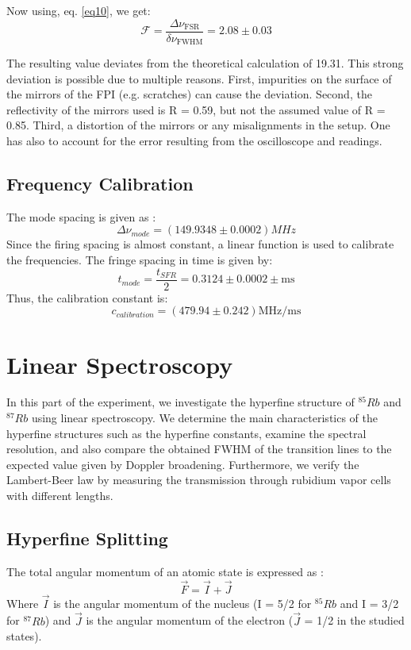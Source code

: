 \documentclass[12pt]{article}
\begin{document}
Now using, eq. \ref{eq10}, we get: 
\begin{equation*}
    \mathcal{F} = \frac{\Delta \nu_{\mathrm{FSR}}}{\delta \nu_{\mathrm{FWHM}}} = 2.08 \pm 0.03 
    \label{eq100}
\end{equation*}

The resulting value deviates from the theoretical calculation of 19.31. This strong deviation is possible due to multiple reasons. First, impurities on the surface of the mirrors of the FPI (e.g. scratches) can cause the deviation. Second, the reflectivity of the mirrors used is R = 0.59, but not the assumed value of R = 0.85. Third, a distortion of the mirrors or any misalignments in the setup. One has also to account for the error resulting from the oscilloscope and readings. 

\subsection{Frequency Calibration}
The mode spacing is given as \cite{lecturenote}:
\begin{equation}
    \Delta \nu_{mode} = (149.9348 \pm 0.0002) MHz 
    \label{eq11}
\end{equation}
Since the firing spacing is almost constant, a linear function is used to calibrate the frequencies. The fringe spacing in time is given by:
\begin{equation}
    t_{mode} = \frac{t_{SFR}}{2} = 0.3124 \pm 0.0002\pm \mathrm{ms}
    \label{eq12}
\end{equation}
Thus, the calibration constant is:
\begin{equation*}
    c_{calibration} = (479.94 \pm 0.242) \mathrm{MHz /ms}
\end{equation*}

\section{Linear Spectroscopy}
In this part of the experiment, we investigate the hyperfine structure of $^{85}Rb$ and $^{87}Rb$ using linear spectroscopy. We determine the main characteristics of the hyperfine structures such as the hyperfine constants, examine the spectral resolution, and also compare the obtained FWHM of the transition lines to the expected value given by Doppler broadening. Furthermore, we verify the Lambert-Beer law by measuring the transmission through rubidium vapor cells with different lengths. 

\subsection{Hyperfine Splitting}
The total angular momentum of an atomic state is expressed as \cite{lecturenote}:
\begin{equation*}
    \vec{F}=\vec{I}+\vec{J}
\end{equation*}
Where $\vec{I}$ is the angular momentum of the nucleus (I = 5/2 for $^{85}Rb$ and I = 3/2 for $^{87}Rb$) and $\vec{J}$ is the angular momentum of the electron ($\vec{J}$ = 1/2 in the studied states).
\end{document}
